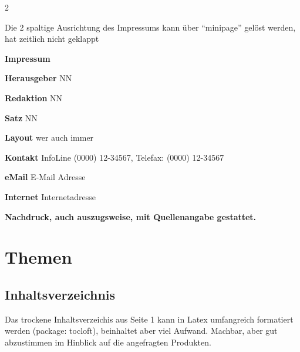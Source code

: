 \documentclass[
  a4paper,
  twoside]{article}
\begin{document}
\begin {multicols}{2}

\vspace*{\textheight}

\columnbreak

\vspace*{12cm}

Die 2 spaltige Ausrichtung des Impressums kann über ``minipage'' gelöst
werden, hat zeitlich nicht geklappt

\textcolor{DoStat}{\textbf{Impressum}}

\textbf{Herausgeber} \hspace{0.5cm} NN

\textbf{Redaktion} \hspace{0.5cm} NN

\textbf{Satz} \hspace{0.5cm} NN

\textbf{Layout} \hspace{0.5cm} wer auch immer

\textbf{Kontakt} \hspace{0.5cm} InfoLine (0000) 12-34567, Telefax:
(0000) 12-34567

\textbf{eMail} \hspace{0.5cm} E-Mail Adresse

\textbf{Internet} \hspace{0.5cm} Internetadresse

\textcolor{DoStat}{\textbf{Nachdruck, auch auszugsweise, mit Quellenangabe gestattet.}}

\end {multicols}

\newpage

\hypertarget{themen}{%
\section{Themen}\label{themen}}

\hypertarget{inhaltsverzeichnis}{%
\subsection*{Inhaltsverzeichnis}\label{inhaltsverzeichnis}}

Das trockene Inhaltsverzeichis aus Seite 1 kann in Latex umfangreich
formatiert werden (package: tocloft), beinhaltet aber viel Aufwand.
Machbar, aber gut abzustimmen im Hinblick auf die angefragten Produkten.
\end{document}
